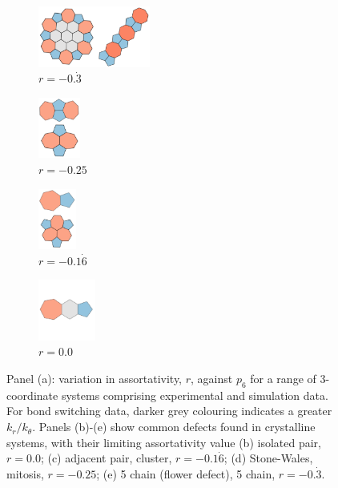 \begin{figure}[bt]
	\vspace{0.5cm}     
     \begin{subfigure}[b]{0.2\textwidth}
         \centering
         \includegraphics[height=2cm]{./figures/general_networks/defect_-33.pdf}
         \caption{$r=-0.\dot{3}$}
         \label{fig:defect33}
     \end{subfigure}
     \hfill
   \begin{subfigure}[b]{0.2\textwidth}
         \centering
         \includegraphics[height=2cm]{./figures/general_networks/defect_-25.pdf}
         \caption{$r=-0.25$}
         \label{fig:defect25}
     \end{subfigure}
     \hfill
     \begin{subfigure}[b]{0.2\textwidth}
      \centering
     \includegraphics[height=2cm]{./figures/general_networks/defect_-17.pdf}
         \caption{$r=-0.1\dot{6}$}
         \label{fig:defect17}
     \end{subfigure}
     \hfill
     \begin{subfigure}[b]{0.2\textwidth}
      \centering
     \includegraphics[height=2cm]{./figures/general_networks/defect_0.pdf}
         \caption{$r=0.0$}
         \label{fig:defect0}
     \end{subfigure}
     \hfill
   
     \caption{Panel (a): variation in assortativity, $r$, against $p_6$ for a range of 3\--coordinate systems comprising experimental and simulation data. For bond switching data, darker grey colouring indicates a greater $k_r/k_\theta$.
Panels (b)\--(e) show common defects found in crystalline systems, with their limiting assortativity value (b) isolated pair, $r=0.0$; (c) adjacent pair, cluster, $r=-0.1\dot{6}$;  (d) Stone\--Wales, mitosis, $r=-0.25$;  (e) 5 chain (flower defect), 5 chain, $r=-0.\dot{3}$.}
     \label{fig:assortgen}
\end{figure}

